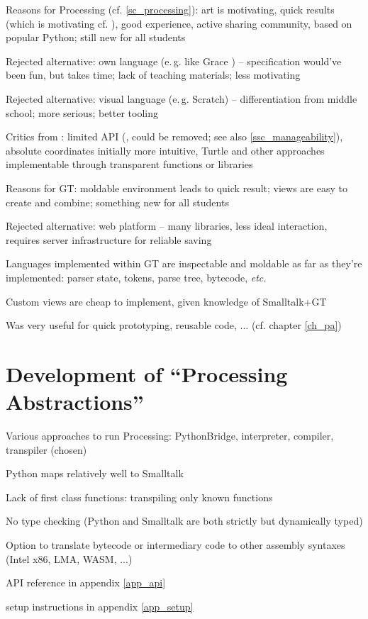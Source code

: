 \begin{todo}
\item Reasons for Processing (cf. \ref{sc_processing}): art is motivating, quick results (which is motivating cf. \cite{Chi23}), good experience, active sharing community, based on popular Python; still new for all students
\item Rejected alternative: own language (e.\,g. like Grace \cite{Bla18}) -- specification would've been fun, but takes time; lack of teaching materials; less motivating
\item Rejected alternative: visual language (e.\,g. Scratch) -- differentiation from middle school; more serious; better tooling
\item Critics from \cite{Chi23}: limited API (,  could be removed; see also \ref{ssc_manageability}), absolute coordinates initially more intuitive, Turtle and other approaches implementable through transparent functions or libraries
\end{todo}

\begin{todo}
\item Reasons for GT: moldable environment leads to quick result; views are easy to create and combine; something new for all students
\item Rejected alternative: web platform -- many libraries, less ideal interaction, requires server infrastructure for reliable saving

\item Languages implemented within GT are inspectable and moldable as far as they're implemented: parser state, tokens, parse tree, bytecode, \emph{etc.}
\item Custom views are cheap to implement, given knowledge of Smalltalk+GT
\item Was very useful for quick prototyping, reusable code, ... (cf. chapter \ref{ch_pa})
\end{todo}


\section{Development of ``Processing Abstractions''}

\begin{todo}
\item Various approaches to run Processing: PythonBridge, interpreter, compiler, transpiler (chosen)
\item Python maps relatively well to Smalltalk
\item Lack of first class functions: transpiling only known functions
\item No type checking (Python and Smalltalk are both strictly but dynamically typed)
\item Option to translate bytecode or intermediary code to other assembly syntaxes (Intel x86, LMA, WASM, ...)
\item API reference in appendix \ref{app_api}
\item setup instructions in appendix \ref{app_setup}
\end{todo}

